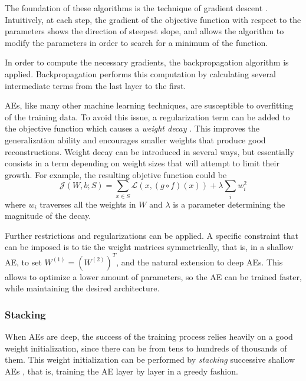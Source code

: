 The foundation of these algorithms is the technique of gradient descent . Intuitively, at each step, the gradient of the objective function with respect to the parameters shows the direction of steepest slope, and allows the algorithm to modify the parameters in order to search for a minimum of the function. 

In order to compute the necessary gradients, the backpropagation algorithm  is applied. Backpropagation performs this computation by calculating several intermediate terms from the last layer to the first.

AEs, like many other machine learning techniques, are susceptible to overfitting of the training data. To avoid this issue, a regularization term can be added to the objective function which causes a \textit{weight decay} . This improves the generalization ability and encourages smaller weights that produce good reconstructions. Weight decay can be introduced in several ways, but essentially consists in a term depending on weight sizes that will attempt to limit their growth. For example, the resulting objetive function could be
\begin{equation}
  \label{p1Eq.wd}
  \mathcal J(W,b;S)=\sum_{x\in S}\mathcal L(x, (g\circ f)(x)) + \lambda \sum_{i}w_i^2
\end{equation}
where $w_i$ traverses all the weights in $W$ and $\lambda$ is a parameter determining the magnitude of the decay.

Further restrictions and regularizations can be applied. A specific constraint that can be imposed is to tie the weight matrices symmetrically, that is, in a shallow AE, to set $W^{(1)}=(W^{(2)})^T$, and the natural extension to deep AEs. This allows to optimize a lower amount of parameters, so the AE can be trained faster, while maintaining the desired architecture.

\subsubsection{Stacking}

When AEs are deep, the success of the training process relies heavily on a good weight initialization, since there can be from tens to hundreds of thousands of them. This weight initialization can be performed by \textit{stacking} successive shallow AEs , that is, training the AE layer by layer in a greedy fashion.

